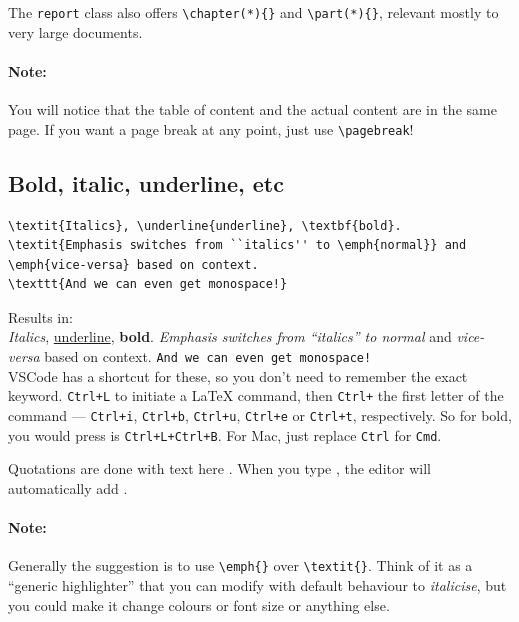 The \verb|report| class also offers \verb|\chapter(*){}| and \verb|\part(*){}|, relevant mostly to very large documents.

\paragraph{Note:} You will notice that the table of content and the actual content are in the same page. If you want a page break at any point, just use \verb|\pagebreak|!

\subsection{Bold, italic, underline, etc}

\begin{lstlisting}
\textit{Italics}, \underline{underline}, \textbf{bold}.
\textit{Emphasis switches from ``italics'' to \emph{normal}} and \emph{vice-versa} based on context.
\texttt{And we can even get monospace!}
\end{lstlisting}
Results in: \\
\textit{Italics}, \underline{underline}, \textbf{bold}.
\textit{Emphasis switches from ``italics'' to \emph{normal}} and \emph{vice-versa} based on context.
\texttt{And we can even get monospace!}\\

VSCode has a shortcut for these, so you don't need to remember the exact keyword. \verb|Ctrl+L| to initiate a LaTeX command, then \verb|Ctrl+| the first letter of the command --- \verb|Ctrl+i|, \verb|Ctrl+b|, \verb|Ctrl+u|, \verb|Ctrl+e| or \verb|Ctrl+t|, respectively.
So for bold, you would press is \verb|Ctrl+L+Ctrl+B|.
For Mac, just replace \verb|Ctrl| for \verb|Cmd|.

Quotations are done with \textasciigrave\textasciigrave text here \textquotesingle\textquotesingle.
When you type \textasciigrave, the editor will automatically add \textquotesingle.

\paragraph{Note:} Generally the suggestion is to use \verb|\emph{}| over \verb|\textit{}|. Think of it as a ``generic highlighter'' that you can modify with default behaviour to \emph{italicise}, but you could make it change colours or font size or anything else.